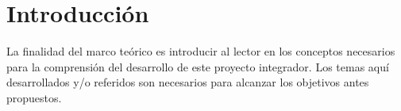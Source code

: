 \section*{Introducción}

La finalidad del marco teórico es introducir al lector en los conceptos
necesarios para la comprensión del desarrollo de este proyecto integrador.
Los temas aquí desarrollados y/o referidos son necesarios para alcanzar los
objetivos antes propuestos.
